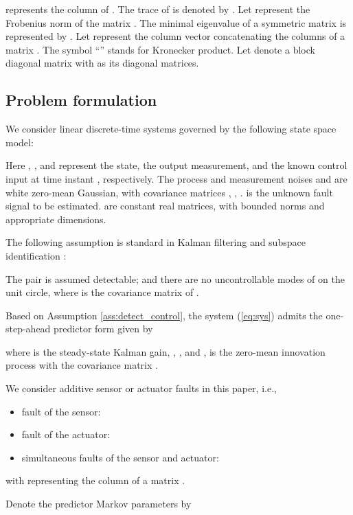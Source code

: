 \documentclass[twocolumn]{autart}
\begin{document}
 represents the  column of . The trace of  is denoted by . Let  represent the Frobenius norm of the matrix . The minimal eigenvalue of a symmetric matrix  is represented by . Let  represent the column vector concatenating the columns of a matrix . The symbol ``'' stands for Kronecker product. Let  denote a block diagonal matrix with  as its diagonal matrices.




\subsection{Problem formulation}\label{sect:system_descrip}
We consider linear discrete-time systems governed by the following state space model:

Here , , and  represent the state, the output measurement, and the known control input at time instant , respectively. The process and measurement noises  and  are white zero-mean Gaussian, with covariance matrices
,
,
.
 is the unknown fault signal to be estimated.
 are constant real matrices, with bounded norms and appropriate dimensions.


The following assumption is standard in Kalman filtering \cite{Kailath2000} and subspace identification \cite{Chiuso2007a, Kata2005}:
\begin{assum}\label{ass:detect_control}
The pair  is assumed detectable; and there are no uncontrollable modes of  on the unit circle, where  is the covariance matrix of .
\end{assum}


Based on Assumption \ref{ass:detect_control}, the system (\ref{eq:sys}) admits the one-step-ahead predictor form given by \cite{Kailath2000}

where  is the steady-state Kalman gain, , , and ,  is the zero-mean innovation process with the covariance matrix . 	


We consider additive sensor or actuator faults in this paper, i.e.,
\begin{itemize}
\item fault of the  sensor: 
	
\item fault of the  actuator: 
	
\item simultaneous faults of the  sensor and  actuator: 
	
\end{itemize}
with  representing the  column of a matrix . 

Denote the predictor Markov parameters by
\end{document}
